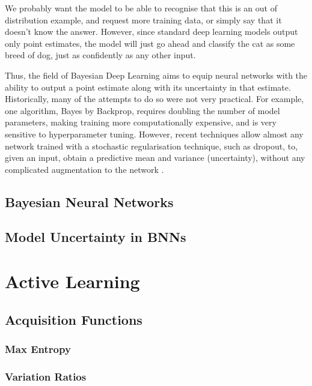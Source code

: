 \documentclass[11pt, a4paper, bibliography=totoc]{report}
\begin{document}
We probably want the model to be able to recognise that this is an out of distribution example, and request more training data, or simply say that it doesn't know the answer. However, since standard deep learning models output only point estimates, the model will just go ahead and classify the cat as some breed of dog, just as confidently as any other input.

Thus, the field of Bayesian Deep Learning aims to equip neural networks with the ability to output a point estimate along with its uncertainty in that estimate. Historically, many of the attempts to do so were not very practical. For example, one algorithm, Bayes by Backprop, requires doubling the number of model parameters, making training more computationally expensive, and is very sensitive to hyperparameter tuning. However, recent techniques allow almost any network trained with a stochastic regularisation technique, such as dropout, to, given an input, obtain a predictive mean and variance (uncertainty), without any complicated augmentation to the network \cite[p.~15]{Gal2017a}.

\section{Bayesian Neural Networks}

\section{Model Uncertainty in BNNs}

\chapter{Active Learning}
\section{Acquisition Functions}

\subsection{Max Entropy}

\subsection{Variation Ratios}
\end{document}
